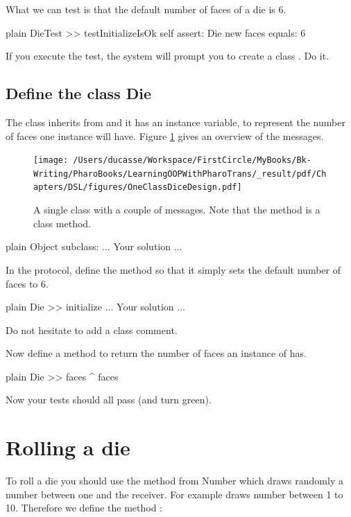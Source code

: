 \documentclass[10pt,twoside,english]{_support/latex/sbabook/sbabook}
\begin{document}
What we can test is that the default number of faces of a die is 6. 

\begin{displaycode}{plain}
DieTest >> testInitializeIsOk
    self assert: Die new faces equals: 6
\end{displaycode}

If you execute the test, the system will prompt you to create a class . Do it.
\subsection{Define the class Die}
The class  inherits from  and it has an instance variable,  to represent the number of faces one instance will have. Figure \ref{figOneClassDiceDesign} gives an overview of the messages. 


\begin{figure}

\begin{center}
\texttt{[image: /Users/ducasse/Workspace/FirstCircle/MyBooks/Bk-Writing/PharoBooks/LearningOOPWithPharoTrans/\_result/pdf/Chapters/DSL/figures/OneClassDiceDesign.pdf]}\caption{A single class with a couple of messages. Note that the method  is  a class method.\label{figOneClassDiceDesign}}\end{center}
\end{figure}


\begin{displaycode}{plain}
Object subclass:
	... Your solution ...
\end{displaycode}

In the  protocol, define the method  so that it simply sets the default number of faces to 6. 

\begin{displaycode}{plain}
Die >> initialize
	... Your solution ...
\end{displaycode}

Do not hesitate to add a class comment. 

Now define a method to return the number of faces an instance of  has.

\begin{displaycode}{plain}
Die >> faces
	^ faces
\end{displaycode}

Now your tests should all pass (and turn green).
\section{Rolling a die}
To roll a die you should use the method from Number  which draws randomly a 
number between one and the receiver. For example  draws number between 1 to 10. 
Therefore we define the method :
\end{document}
